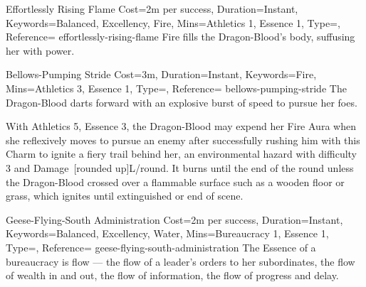 

\begin{Charm}{Effortlessly Rising Flame}{%
    Cost=2m per success,
    Duration=Instant,
    Keywords={Balanced, Excellency, Fire},
    Mins={Athletics 1, Essence 1},
    Type=\SupplementalType,
    Reference=\cite*[p.~168]{db}
}{effortlessly-rising-flame}
    Fire fills the Dragon-Blood's body, suffusing her with power. 
\end{Charm}


\begin{Charm}{Bellows-Pumping Stride}{%
    Cost=3m,
    Duration=Instant,
    Keywords=Fire,
    Mins={Athletics 3, Essence 1},
    Type=\SupplementalType,
    Reference=\cite*[p.~168]{db}
}{bellows-pumping-stride}
    The Dragon-Blood darts forward with an explosive burst of speed to pursue her
    foes. 

    \begin{Unavailable}
        With Athletics 5, Essence 3, the Dragon-Blood may expend her Fire Aura when
        she reflexively moves to pursue an enemy after successfully rushing him with
        this Charm to ignite a fiery trail behind her, an environmental hazard with
        difficulty 3 and Damage~[rounded up]L/round. It burns
        until the end of the round unless the Dragon-Blood crossed over a flammable
        surface such as a wooden floor or grass, which ignites until extinguished or
        end of scene.
    \end{Unavailable}
\end{Charm}




\begin{Charm}{Geese-Flying-South Administration}{%
    Cost=2m per success,
    Duration=Instant,
    Keywords={Balanced, Excellency, Water},
    Mins={Bureaucracy 1, Essence 1},
    Type=\SupplementalType,
    Reference=\cite*[p.~181]{db}
}{geese-flying-south-administration}
    The Essence of a bureaucracy is flow --- the flow of a leader's orders to her
    subordinates, the flow of wealth in and out, the flow of information, the flow
    of progress and delay. 
\end{Charm}


